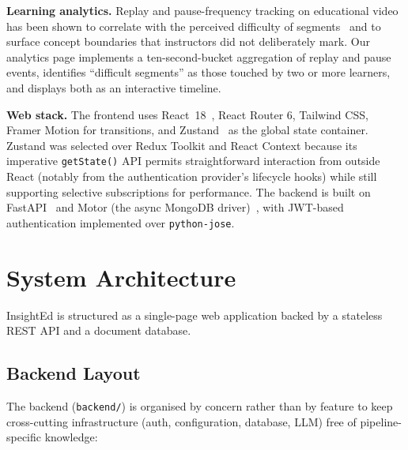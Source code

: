\documentclass[conference]{IEEEtran}
\begin{document}
\textbf{Learning analytics.} Replay and pause-frequency tracking on educational video has been shown to correlate with the perceived difficulty of segments~\cite{kim2014} and to surface concept boundaries that instructors did not deliberately mark. Our analytics page implements a ten-second-bucket aggregation of replay and pause events, identifies ``difficult segments'' as those touched by two or more learners, and displays both as an interactive timeline.

\textbf{Web stack.} The frontend uses React~18~\cite{react}, React Router 6, Tailwind CSS, Framer Motion for transitions, and Zustand~\cite{zustand} as the global state container. Zustand was selected over Redux Toolkit and React Context because its imperative \texttt{getState()} API permits straightforward interaction from outside React (notably from the authentication provider's lifecycle hooks) while still supporting selective subscriptions for performance. The backend is built on FastAPI~\cite{fastapi} and Motor (the async MongoDB driver)~\cite{motor}, with JWT-based authentication implemented over \texttt{python-jose}.

\section{System Architecture}\label{sec:arch}

InsightEd is structured as a single-page web application backed by a stateless REST API and a document database.

\subsection{Backend Layout}

The backend (\texttt{backend/}) is organised by concern rather than by feature to keep cross-cutting infrastructure (auth, configuration, database, LLM) free of pipeline-specific knowledge:
\end{document}
